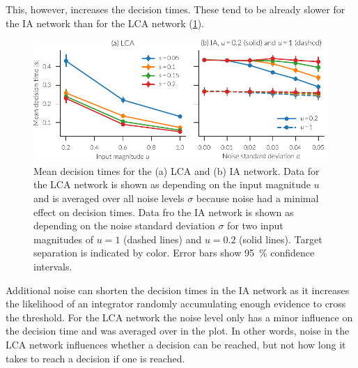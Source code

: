 This, however, increases the decision times.
These tend to be already slower for the IA network than for the LCA network (\cref{fig:ia-time}).
\begin{figure}
    \centering
    \includegraphics{figures/ia-time}
    \caption[Mean WTA decisions times.]{Mean decision times for the (a) LCA and (b) IA network. Data for the LCA network is shown as depending on the input magnitude $u$ and is averaged over all noise levels $\sigma$ because noise had a minimal effect on decision times. Data fro the IA network is shown as depending on the noise standard deviation $\sigma$ for two input magnitudes of $u = 1$ (dashed lines) and $u = 0.2$ (solid lines). Target separation is indicated by color. Error bars show \SI{95}{\percent} confidence intervals.}\label{fig:ia-time}
\end{figure}
Additional noise can shorten the decision times in the IA network as it increases the likelihood of an integrator randomly accumulating enough evidence to cross the threshold.
For the LCA network the noise level only has a minor influence on the decision time and was averaged over in the plot.
In other words, noise in the LCA network influences whether a decision can be reached, but not how long it takes to reach a decision if one is reached.

